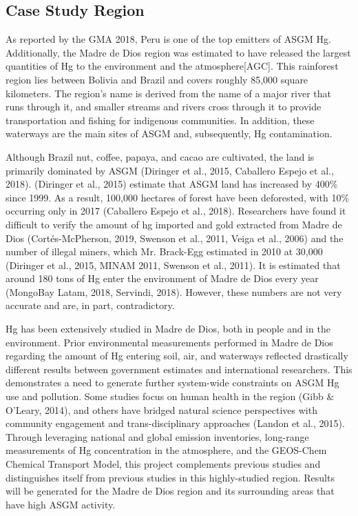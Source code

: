 \subsection{Case Study Region}
\begin{flushleft}
As reported by the GMA 2018, Peru is one of the top emitters of ASGM Hg. Additionally, the Madre de Dios region was estimated to have released the largest quantities of Hg to the environment and the atmosphere[AGC]. This rainforest region lies between Bolivia and Brazil and covers roughly 85,000 square kilometers. The region's name is derived from the name of a major river that runs through it, and smaller streams and rivers cross through it to provide transportation and fishing for indigenous communities. In addition, these waterways are the main sites of ASGM and, subsequently, Hg contamination. 
\end{flushleft}
\begin{flushleft}
Although Brazil nut, coffee, papaya, and cacao are cultivated, the land is primarily dominated by ASGM (Diringer et al., 2015, Caballero Espejo et al., 2018). (Diringer et al., 2015) estimate that ASGM land has increased by 400\% since 1999. As a result, 100,000 hectares of forest have been deforested, with 10\% occurring only in 2017 (Caballero Espejo et al., 2018). Researchers have found it difficult to verify the amount of hg imported and gold extracted from Madre de Dios (Cortés-McPherson, 2019, Swenson et al., 2011, Veiga et al., 2006) and the number of illegal miners, which Mr. Brack-Egg estimated in 2010 at 30,000 (Diringer et al., 2015, MINAM 2011, Swenson et al., 2011). It is estimated that around 180 tons of Hg enter the environment of Madre de Dios every year (MongoBay Latam, 2018, Servindi, 2018). However, these numbers are not very accurate and are, in part, contradictory. 
\end{flushleft}
\begin{flushleft}
Hg has been extensively studied in Madre de Dios, both in people and in the environment. Prior environmental measurements performed in Madre de Dios regarding the amount of Hg entering soil, air, and waterways reflected drastically different results between government estimates and international researchers. This demonstrates a need to generate further system-wide constraints on ASGM Hg use and pollution. Some studies focus on human health in the region (Gibb \& O'Leary, 2014), and others have bridged natural science perspectives with community engagement and trans-disciplinary approaches (Landon et al., 2015). Through leveraging national and global emission inventories, long-range measurements of Hg concentration in the atmosphere, and the GEOS-Chem Chemical Transport Model, this project complements previous studies and distinguishes itself from previous studies in this highly-studied region. Results will be generated for the Madre de Dios region and its surrounding areas that have high ASGM activity. 
\end{flushleft}
